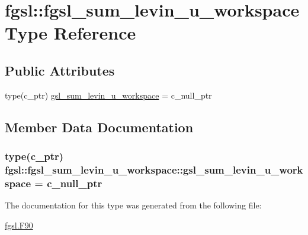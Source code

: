 \hypertarget{structfgsl_1_1fgsl__sum__levin__u__workspace}{}\section{fgsl\+:\+:fgsl\+\_\+sum\+\_\+levin\+\_\+u\+\_\+workspace Type Reference}
\label{structfgsl_1_1fgsl__sum__levin__u__workspace}
\subsection*{Public Attributes}
\begin{DoxyCompactItemize}
\item 
type(c\+\_\+ptr) \hyperlink{structfgsl_1_1fgsl__sum__levin__u__workspace_a316ec6b79426fa7cfd0939aa41d162ec}{gsl\+\_\+sum\+\_\+levin\+\_\+u\+\_\+workspace} = c\+\_\+null\+\_\+ptr
\end{DoxyCompactItemize}


\subsection{Member Data Documentation}
\hypertarget{structfgsl_1_1fgsl__sum__levin__u__workspace_a316ec6b79426fa7cfd0939aa41d162ec}{}
\subsubsection[{gsl\+\_\+sum\+\_\+levin\+\_\+u\+\_\+workspace}]{\setlength{\rightskip}{0pt plus 5cm}type(c\+\_\+ptr) fgsl\+::fgsl\+\_\+sum\+\_\+levin\+\_\+u\+\_\+workspace\+::gsl\+\_\+sum\+\_\+levin\+\_\+u\+\_\+workspace = c\+\_\+null\+\_\+ptr}\label{structfgsl_1_1fgsl__sum__levin__u__workspace_a316ec6b79426fa7cfd0939aa41d162ec}


The documentation for this type was generated from the following file\+:\begin{DoxyCompactItemize}
\item 
\hyperlink{fgsl_8F90}{fgsl.\+F90}\end{DoxyCompactItemize}
